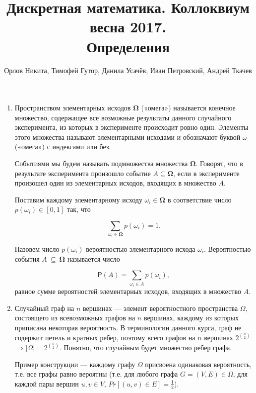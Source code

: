 \documentclass[a4paper,12pt]{article}
\begin{document}
	\title{Дискретная математика. Коллоквиум весна 2017.\\ Определения}
    \author{Орлов Никита, Тимофей Гутор, Данила Усачёв, Иван Петровский, Андрей Ткачев}
	\maketitle
	
	\begin{enumerate}
	
	 \item 
    
	Пространством элементарных исходов   ${\mathbf \Omega}$ («омега») называется конечное множество, содержащее все возможные результаты 	данного случайного эксперимента, из которых в эксперименте происходит ровно один. Элементы этого множества называют элементарными исходами  и обозначают буквой $\omega$ («омега») с индексами или без.

	Событиями  мы будем называть подмножества множества ${\mathbf \Omega}$. Говорят, что в результате эксперимента произошло событие  	$A\subseteq \mathbf \Omega$, если в эксперименте произошел один из элементарных исходов, входящих в множество $A$.

	Поставим каждому элементарному исходу  $\omega_i\in \mathbf\Omega$ в соответствие число  $p (\omega_i)\in [0,1]$ так, что

	\[\sum_{\omega_i\in \mathbf\Omega} p(\omega_i) =1.\]

	Назовем число $p (\omega_i)$ вероятностью  элементарного исхода $\omega_i$. Вероятностью  события $A~\subseteq~\mathbf\Omega$ 	называется число

	$${\mathsf P}(A) = \sum_{\omega_i\in A} p(\omega_i),$$
	равное сумме вероятностей элементарных исходов, входящих в множество $A$.
	\item 
    
    Случайный граф на $n$ вершинах --- элемент вероятностного пространства $\Omega$, состоящего из всевозможных графов на $n$ вершинах, каждому из которых приписана некоторая вероятность. В терминологии данного курса, граф не содержит петель и кратных ребер, поэтому всего графов на $n$ вершинах $2^{n \choose 2}$ $\Rightarrow |\Omega| = 2^{n \choose 2}$. Понятно, что случайным будет множество ребер графа.
    
    Пример конструкции --- каждому графу $\Omega$ присвоена одинаковая вероятность, т.е. все графы равно вероятны (т.е. для любого графа $G = (V, E) \in \Omega$, для каждой пары вершин $u, v \in V$, $Pr[(u, v) \in E] = \frac{1}{2}$).
    

\end{enumerate}
\end{document}
